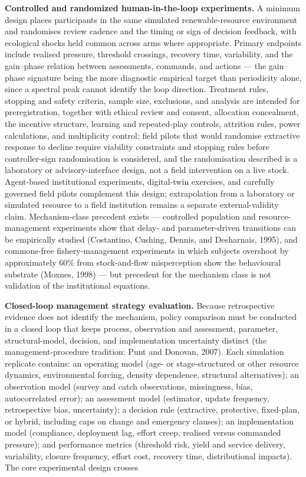 \documentclass[11pt]{article}
\begin{document}
\textbf{Controlled and randomized human-in-the-loop experiments.} A
minimum design places participants in the same simulated
renewable-resource environment and randomises review cadence and the
timing or sign of decision feedback, with
ecological shocks held common across arms where appropriate. Primary
endpoints include realised pressure, threshold crossings, recovery time,
variability, and the gain--phase relation between assessments, commands,
and actions --- the gain--phase signature being the more diagnostic
empirical target than periodicity alone, since a spectral peak cannot
identify the loop direction. Treatment rules, stopping and safety
criteria, sample size, exclusions, and analysis are intended for
preregistration, together with ethical review and consent, allocation concealment, the incentive structure, learning and repeated-play controls, attrition rules, power calculations, and multiplicity control; field pilots that would randomise extractive response
to decline require viability constraints and stopping rules before
controller-sign randomisation is considered, and the randomisation
described is a laboratory or advisory-interface design, not a field
intervention on a live stock. Agent-based institutional experiments,
digital-twin exercises, and carefully governed field pilots complement
this design; extrapolation from a laboratory or simulated resource to a
field institution remains a separate external-validity claim.
Mechanism-class precedent exists --- controlled population and
resource-management experiments show that delay- and parameter-driven
transitions can be empirically studied (Costantino, Cushing, Dennis, and
Desharnais, 1995), and commons-free fishery-management experiments in
which subjects overshoot by approximately 60\% from stock-and-flow
misperception show the behavioural substrate (Moxnes, 1998) --- but
precedent for the mechanism class is not validation of the institutional
equations.

\textbf{Closed-loop management strategy evaluation.} Because
retrospective evidence does not identify the mechanism, policy
comparison must be conducted in a closed loop that keeps process,
observation and assessment, parameter, structural-model, decision, and
implementation uncertainty distinct (the management-procedure tradition:
Punt and Donovan, 2007). Each simulation replicate contains: an
operating model (age- or stage-structured or other resource dynamics,
environmental forcing, density dependence, structural alternatives); an
observation model (survey and catch observations, missingness, bias,
autocorrelated error); an assessment model (estimator, update frequency,
retrospective bias, uncertainty); a decision rule (extractive,
protective, fixed-plan, or hybrid, including caps on change and
emergency clauses); an implementation model (compliance, deployment lag,
effort creep, realised versus commanded pressure); and performance
metrics (threshold risk, yield and service delivery, variability,
closure frequency, effort cost, recovery time, distributional impacts).
The core experimental design crosses
\end{document}
